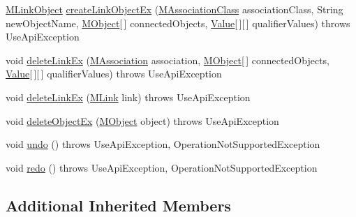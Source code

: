 \begin{DoxyCompactItemize}
\item 
\hyperlink{interfaceorg_1_1tzi_1_1use_1_1uml_1_1sys_1_1_m_link_object}{M\-Link\-Object} \hyperlink{classorg_1_1tzi_1_1use_1_1api_1_1impl_1_1_use_system_api_undoable_a62b51963a5d6579da63ec4ad2105d218}{create\-Link\-Object\-Ex} (\hyperlink{interfaceorg_1_1tzi_1_1use_1_1uml_1_1mm_1_1_m_association_class}{M\-Association\-Class} association\-Class, String new\-Object\-Name, \hyperlink{interfaceorg_1_1tzi_1_1use_1_1uml_1_1sys_1_1_m_object}{M\-Object}\mbox{[}$\,$\mbox{]} connected\-Objects, \hyperlink{classorg_1_1tzi_1_1use_1_1uml_1_1ocl_1_1value_1_1_value}{Value}\mbox{[}$\,$\mbox{]}\mbox{[}$\,$\mbox{]} qualifier\-Values)  throws Use\-Api\-Exception 
\item 
void \hyperlink{classorg_1_1tzi_1_1use_1_1api_1_1impl_1_1_use_system_api_undoable_ac898c1b7f09ae8333d128c6565b0062e}{delete\-Link\-Ex} (\hyperlink{interfaceorg_1_1tzi_1_1use_1_1uml_1_1mm_1_1_m_association}{M\-Association} association, \hyperlink{interfaceorg_1_1tzi_1_1use_1_1uml_1_1sys_1_1_m_object}{M\-Object}\mbox{[}$\,$\mbox{]} connected\-Objects, \hyperlink{classorg_1_1tzi_1_1use_1_1uml_1_1ocl_1_1value_1_1_value}{Value}\mbox{[}$\,$\mbox{]}\mbox{[}$\,$\mbox{]} qualifier\-Values)  throws Use\-Api\-Exception 
\item 
void \hyperlink{classorg_1_1tzi_1_1use_1_1api_1_1impl_1_1_use_system_api_undoable_a76a7a9d2eb3fb505d03d7c7ec034ffc1}{delete\-Link\-Ex} (\hyperlink{interfaceorg_1_1tzi_1_1use_1_1uml_1_1sys_1_1_m_link}{M\-Link} link)  throws Use\-Api\-Exception 
\item 
void \hyperlink{classorg_1_1tzi_1_1use_1_1api_1_1impl_1_1_use_system_api_undoable_aa77e4bd333bf57625c9e05d2d8f3a8df}{delete\-Object\-Ex} (\hyperlink{interfaceorg_1_1tzi_1_1use_1_1uml_1_1sys_1_1_m_object}{M\-Object} object)  throws Use\-Api\-Exception 
\item 
void \hyperlink{classorg_1_1tzi_1_1use_1_1api_1_1impl_1_1_use_system_api_undoable_afe61f20fc2ec4a125518ac2b2637e0f2}{undo} ()  throws Use\-Api\-Exception, Operation\-Not\-Supported\-Exception 
\item 
void \hyperlink{classorg_1_1tzi_1_1use_1_1api_1_1impl_1_1_use_system_api_undoable_a67c7c378d4198aab358658b1baed8f96}{redo} ()  throws Use\-Api\-Exception, Operation\-Not\-Supported\-Exception 
\end{DoxyCompactItemize}
\subsection*{Additional Inherited Members}


